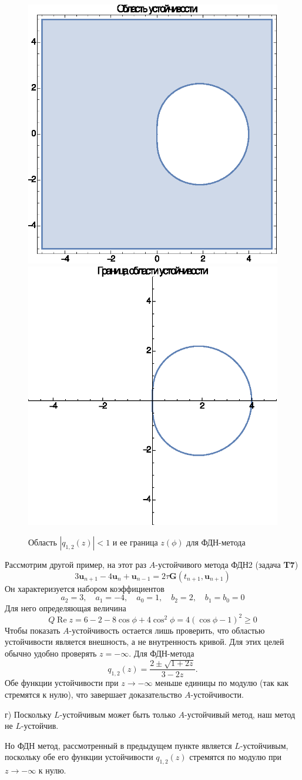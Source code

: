 \documentclass[12pt]{article}
\renewcommand{\vec}[1]{\boldsymbol{\mathbf{#1}}}
\begin{document}
\begin{figure}
	\centering
	\includegraphics[width=.45\textwidth]{test2_gr1.eps}\quad%
	\includegraphics[width=.45\textwidth]{test2_gr2.eps}
	\caption{Область $|q_{1,2}(z)| < 1$ и ее граница $z(\phi)$ для ФДН-метода} 
\end{figure}

Рассмотрим другой пример, на этот раз $A$-устойчивого метода ФДН2 (задача \textbf{T7})
\[
3 \vec u_{n+1} - 4 \vec u_n + \vec u_{n-1} = 2 \tau \vec G(t_{n+1}, \vec u_{n+1})
\]
Он характеризуется набором коэффициентов 
\[
a_2 = 3, \quad a_1 = -4, \quad a_0 = 1, \quad b_2 = 2, \quad b_1 = b_0 = 0
\]
Для него определяющая величина
\[
Q \operatorname{Re} z = 6 - 2 - 8 \cos \phi + 4 \cos^2 \phi = 4 (\cos \phi - 1)^2 \geqslant 0
\]
Чтобы показать $A$-устойчивость остается лишь проверить, что областью устойчивости является внешность, а не внутренность кривой. Для этих целей обычно удобно проверять $z = -\infty$.
Для ФДН-метода 
\[
q_{1,2}(z) = \frac{2 \pm \sqrt{1 + 2z}}{3 - 2z}.
\]
Обе функции устойчивости при $z \rightarrow -\infty$ меньше единицы по модулю (так как стремятся к нулю), что завершает доказательство $A$-устойчивости.

г) Поскольку $L$-устойчивым может быть только $A$-устойчивый метод, наш метод не $L$-устойчив.

Но ФДН метод, рассмотренный в предыдущем пункте является $L$-устойчивым, поскольку обе его функции устойчивости $q_{1,2}(z)$ стремятся по модулю при $z \rightarrow -\infty$ к нулю.
\end{document}
